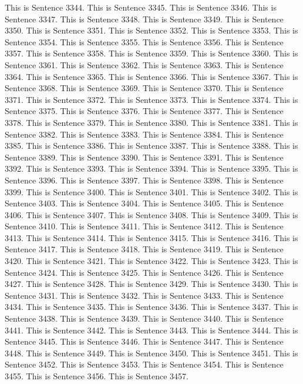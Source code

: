 \documentclass{article}
\begin{document}
This is Sentence 3344.
This is Sentence 3345.
This is Sentence 3346.
This is Sentence 3347.
This is Sentence 3348.
This is Sentence 3349.
This is Sentence 3350.
This is Sentence 3351.
This is Sentence 3352.
This is Sentence 3353.
This is Sentence 3354.
This is Sentence 3355.
This is Sentence 3356.
This is Sentence 3357.
This is Sentence 3358.
This is Sentence 3359.
This is Sentence 3360.
This is Sentence 3361.
This is Sentence 3362.
This is Sentence 3363.
This is Sentence 3364.
This is Sentence 3365.
This is Sentence 3366.
This is Sentence 3367.
This is Sentence 3368.
This is Sentence 3369.
This is Sentence 3370.
This is Sentence 3371.
This is Sentence 3372.
This is Sentence 3373.
This is Sentence 3374.
This is Sentence 3375.
This is Sentence 3376.
This is Sentence 3377.
This is Sentence 3378.
This is Sentence 3379.
This is Sentence 3380.
This is Sentence 3381.
This is Sentence 3382.
This is Sentence 3383.
This is Sentence 3384.
This is Sentence 3385.
This is Sentence 3386.
This is Sentence 3387.
This is Sentence 3388.
This is Sentence 3389.
This is Sentence 3390.
This is Sentence 3391.
This is Sentence 3392.
This is Sentence 3393.
This is Sentence 3394.
This is Sentence 3395.
This is Sentence 3396.
This is Sentence 3397.
This is Sentence 3398.
This is Sentence 3399.
This is Sentence 3400.
This is Sentence 3401.
This is Sentence 3402.
This is Sentence 3403.
This is Sentence 3404.
This is Sentence 3405.
This is Sentence 3406.
This is Sentence 3407.
This is Sentence 3408.
This is Sentence 3409.
This is Sentence 3410.
This is Sentence 3411.
This is Sentence 3412.
This is Sentence 3413.
This is Sentence 3414.
This is Sentence 3415.
This is Sentence 3416.
This is Sentence 3417.
This is Sentence 3418.
This is Sentence 3419.
This is Sentence 3420.
This is Sentence 3421.
This is Sentence 3422.
This is Sentence 3423.
This is Sentence 3424.
This is Sentence 3425.
This is Sentence 3426.
This is Sentence 3427.
This is Sentence 3428.
This is Sentence 3429.
This is Sentence 3430.
This is Sentence 3431.
This is Sentence 3432.
This is Sentence 3433.
This is Sentence 3434.
This is Sentence 3435.
This is Sentence 3436.
This is Sentence 3437.
This is Sentence 3438.
This is Sentence 3439.
This is Sentence 3440.
This is Sentence 3441.
This is Sentence 3442.
This is Sentence 3443.
This is Sentence 3444.
This is Sentence 3445.
This is Sentence 3446.
This is Sentence 3447.
This is Sentence 3448.
This is Sentence 3449.
This is Sentence 3450.
This is Sentence 3451.
This is Sentence 3452.
This is Sentence 3453.
This is Sentence 3454.
This is Sentence 3455.
This is Sentence 3456.
This is Sentence 3457.
\end{document}
